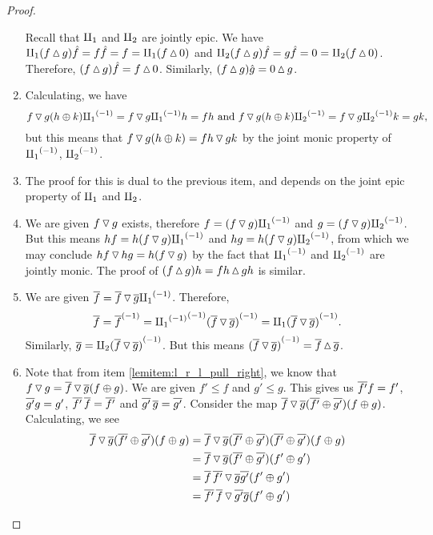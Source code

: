 \begin{proof}
\begin{enumerate}[{(}i{)}]
      Recall that $\amalg_{1}$ and $\amalg_{2}$ are jointly epic. We have
      $\amalg_{1}(f \operatorname{\vartriangle} g)\hat{f} = f\hat{f} = f = \amalg_{1}(f\operatorname{\vartriangle} 0) $ and
      $\amalg_{2}(f \operatorname{\vartriangle} g)\hat{f} = g\hat{f} = 0= \amalg_{2}(f\operatorname{\vartriangle} 0)$.
      Therefore, $(f \operatorname{\vartriangle} g)\hat{f} = f \operatorname{\vartriangle} 0$. Similarly,
      $(f \operatorname{\vartriangle} g) \hat{g} = 0 \operatorname{\vartriangle} g$.
    \item Calculating, we have
      \[
        f \operatorname{\triangledown} g (h \oplus k) {\amalg_{1}}^{(-1)} = f\operatorname{\triangledown} g {\amalg_{1}}^{(-1)} h = f h \text{ and }
        f \operatorname{\triangledown} g (h \oplus k) {\amalg_{2}}^{(-1)} = f\operatorname{\triangledown} g {\amalg_{2}}^{(-1)} k = g k,
      \]
      but this means that
      $f \operatorname{\triangledown} g (h \oplus k) = f h \operatorname{\triangledown} g k$ by the joint monic property of ${\amalg_{1}}^{(-1)}$, ${\amalg_{2}}^{(-1)}$.
    \item The proof for this is dual to the previous item, and depends on the joint epic property
      of $\amalg_{1}$ and $\amalg_{2}$.
    \item We are given $f\operatorname{\triangledown} g$ exists, therefore $f = (f\operatorname{\triangledown} g){\amalg_{1}}^{(-1)}$ and
      $g = (f\operatorname{\triangledown} g){\amalg_{2}}^{(-1)}$. But this means $hf = h(f\operatorname{\triangledown} g){\amalg_{1}}^{(-1)}$ and
      $hg = h(f\operatorname{\triangledown} g){\amalg_{2}}^{(-1)}$, from which we may conclude $hf \operatorname{\triangledown} hg = h(f\operatorname{\triangledown} g)$ by
      the fact that ${\amalg_{1}}^{(-1)}$ and ${\amalg_{2}}^{(-1)}$ are jointly monic. The proof of
      $(f\operatorname{\vartriangle} g)h = f h \operatorname{\vartriangle} g h$ is similar.
    \item We are given $\overline{f} = \overline{f}\operatorname{\triangledown}\overline{g} {\amalg_{1}}^{(-1)}$. Therefore,
      \[
        \overline{f} = {\overline{f}}^{(-1)} = {{\amalg_{1}}^{(-1)}}^{(-1)}{(\overline{f}\operatorname{\triangledown}\overline{g})}^{(-1)}
          = \amalg_{1} {(\overline{f}\operatorname{\triangledown}\overline{g})}^{(-1)}.
      \]
      Similarly, $\overline{g} = \amalg_{2} {(\overline{f}\operatorname{\triangledown}\overline{g})}^{(-1)}$. But this means
      ${(\overline{f}\operatorname{\triangledown}\overline{g})}^{(-1)} = \overline{f}\operatorname{\vartriangle}\overline{g}$.
    \item Note that from item \ref{lemitem:l_r_l_pull_right}, we know that
      $f \operatorname{\triangledown} g  = \overline{f} \operatorname{\triangledown} \overline{g} (f\oplus g)$. We are given $f' \le f$ and $g' \le g$. This
      gives us $\overline{f'}f =f'$, $\overline{g'}g =g'$, $\overline{f'}\,\overline{f} =\overline{f'}$ and
      $\overline{g'}\,\overline{g} =\overline{g'}$. Consider the map
      $\overline{f} \operatorname{\triangledown} \overline{g} (\overline{f'}\oplus\overline{g'})(f\oplus g)$. Calculating, we see
      \begin{align*}
        \rst{f} \tjleft \rst{g} (\rst{f'}\+\rst{g'})(f\+g)
          &= \rst{f} \tjleft \rst{g} (\rst{f'}\+\rst{g'})(\rst{f'}\+\rst{g'})(f\+g) \\
          & = \rst{f} \tjleft \rst{g} (\rst{f'}\+\rst{g'})(f'\+g') \\
          & = \rst{f}\,\rst{f'} \tjleft \rst{g} \rst{g'} (f'\+g') \\
          & = \rst{f'}\,\rst{f} \tjleft \rst{g'} \rst{g} (f'\+g') \\

\end{align*}
\end{enumerate}
\end{proof}
